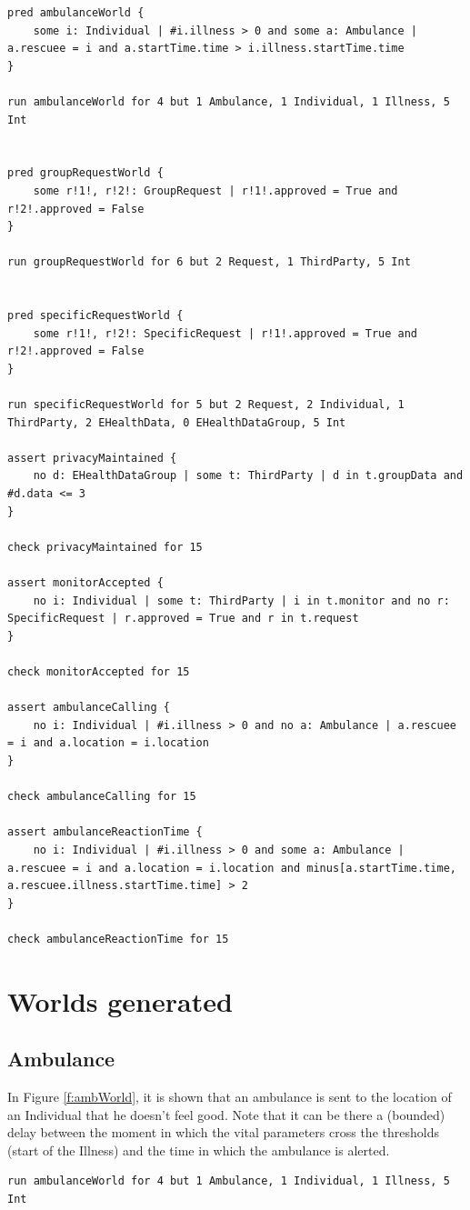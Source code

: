 \begin{lstlisting}
pred ambulanceWorld {
	some i: Individual | #i.illness > 0 and some a: Ambulance | a.rescuee = i and a.startTime.time > i.illness.startTime.time
}

run ambulanceWorld for 4 but 1 Ambulance, 1 Individual, 1 Illness, 5 Int


pred groupRequestWorld {
	some r!1!, r!2!: GroupRequest | r!1!.approved = True and r!2!.approved = False
}

run groupRequestWorld for 6 but 2 Request, 1 ThirdParty, 5 Int


pred specificRequestWorld {
	some r!1!, r!2!: SpecificRequest | r!1!.approved = True and r!2!.approved = False
}

run specificRequestWorld for 5 but 2 Request, 2 Individual, 1 ThirdParty, 2 EHealthData, 0 EHealthDataGroup, 5 Int

assert privacyMaintained {
	no d: EHealthDataGroup | some t: ThirdParty | d in t.groupData and #d.data <= 3
}

check privacyMaintained for 15

assert monitorAccepted {
	no i: Individual | some t: ThirdParty | i in t.monitor and no r: SpecificRequest | r.approved = True and r in t.request
}

check monitorAccepted for 15

assert ambulanceCalling {
	no i: Individual | #i.illness > 0 and no a: Ambulance | a.rescuee = i and a.location = i.location
}

check ambulanceCalling for 15

assert ambulanceReactionTime {
	no i: Individual | #i.illness > 0 and some a: Ambulance | a.rescuee = i and a.location = i.location and minus[a.startTime.time, a.rescuee.illness.startTime.time] > 2
}

check ambulanceReactionTime for 15
\end{lstlisting}




\section{Worlds generated}

\subsection{Ambulance}
In Figure \ref{f:ambWorld}, it is shown that an ambulance is sent to the location of an Individual that he doesn't feel good.
Note that it can be there a (bounded) delay between the moment in which the vital parameters cross the thresholds (start of the Illness) and the time in which the ambulance is alerted.
\begin{lstlisting}[numbers=none]
run ambulanceWorld for 4 but 1 Ambulance, 1 Individual, 1 Illness, 5 Int
\end{lstlisting}

